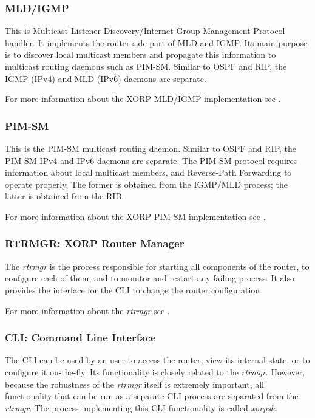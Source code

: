 \documentclass[11pt]{article}
\begin{document}
\subsubsection{MLD/IGMP}

This is Multicast Listener Discovery/Internet Group Management Protocol
handler. It implements the router-side part of MLD and IGMP. Its main
purpose is to discover local multicast members and propagate this
information to multicast routing daemons such as PIM-SM.
Similar to OSPF and RIP, the IGMP (IPv4) and MLD (IPv6) daemons are
separate.

For more information about the XORP MLD/IGMP implementation see
\cite{xorp:mld_igmp}.

\subsubsection{PIM-SM}

This is the PIM-SM multicast routing daemon. Similar to OSPF and RIP,
the PIM-SM IPv4 and IPv6 daemons are separate. The PIM-SM protocol requires
information about local multicast members, and Reverse-Path Forwarding
to operate properly. The former is obtained from the IGMP/MLD process;
the latter is obtained from the RIB.

For more information about the XORP PIM-SM implementation see
\cite{xorp:pim}.

\subsubsection{RTRMGR: XORP Router Manager}

The {\em rtrmgr} is the process responsible for starting all components of
the router, to configure each of them, and to monitor and restart any
failing process.  It also provides the interface for the CLI to change
the router configuration.

For more information about the {\em rtrmgr} see
\cite{xorp:rtrmgr}.

\subsubsection{CLI: Command Line Interface}

The CLI can be used by an user to access the router, view
its internal state, or to configure it on-the-fly. Its functionality
is closely related to the {\em rtrmgr}. However, because the robustness of
the {\em rtrmgr} itself is extremely important, all functionality that can
be run as a separate CLI process are separated from the {\em rtrmgr}.  The
process implementing this CLI functionality is called {\em xorpsh}.
\end{document}
